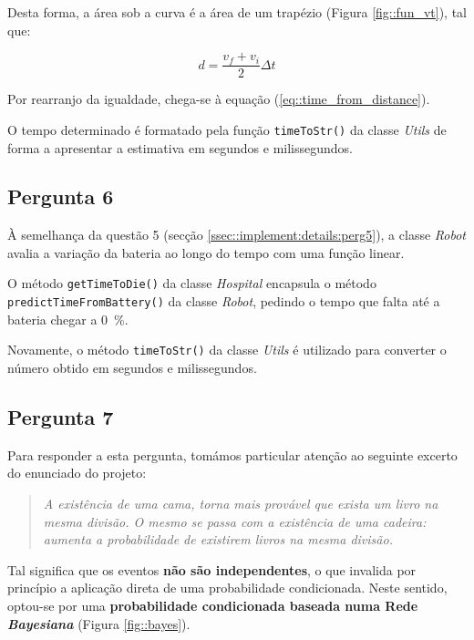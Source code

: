 Desta forma, a área sob a curva é a área de um trapézio (Figura \ref{fig::fun_vt}), tal que:

\begin{equation}
    d = \frac{v_f + v_i}{2}\Delta t
\end{equation}

Por rearranjo da igualdade, chega-se à equação (\ref{eq::time_from_distance}).

O tempo determinado é formatado pela função \texttt{timeToStr()} da classe \textit{Utils} de forma a apresentar a estimativa em segundos e milissegundos.



\subsection{Pergunta 6}
\label{ssec::implement:details:perg6}


À semelhança da questão 5 (secção \ref{ssec::implement:details:perg5}), a classe \textit{Robot} avalia a variação da bateria ao longo do tempo com uma função linear.

O método \texttt{getTimeToDie()} da classe \textit{Hospital} encapsula o método \texttt{predictTimeFromBattery()} da classe \textit{Robot}, pedindo o tempo que falta até a bateria chegar a \SI{0}{\percent}.

Novamente, o método \texttt{timeToStr()} da classe \textit{Utils} é utilizado para converter o número obtido em segundos e milissegundos.


\subsection{Pergunta 7}
\label{ssec::implement:details:perg7}


Para responder a esta pergunta, tomámos particular atenção ao seguinte excerto do enunciado do projeto:

\begin{quote}
    \itshape A existência de uma cama, torna mais provável que exista um livro na mesma divisão. O mesmo se passa com a existência de uma cadeira: aumenta a probabilidade de existirem livros na mesma divisão.
\end{quote}

Tal significa que os eventos \textbf{não são independentes}, o que invalida por princípio a aplicação direta de uma probabilidade condicionada. Neste sentido, optou-se por uma \textbf{probabilidade condicionada baseada numa Rede \textit{Bayesiana}} (Figura \ref{fig::bayes}).


